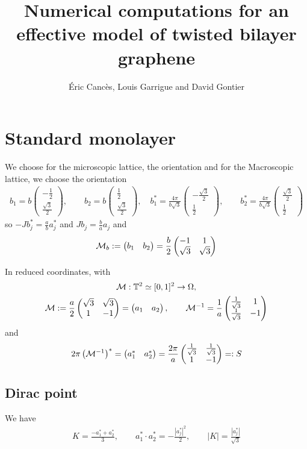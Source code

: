 \documentclass[11pt,a4paper,reqno,french,tikz]{amsart}
\title[Numerics effective TBG]{Numerical computations for an effective model of twisted bilayer graphene}
\author[É. Cancès, L. Garrigue and D. Gontier]{Éric Cancès, Louis Garrigue and David Gontier}
\newcommand{\pa}[1]{\left( #1 \right)} %
\newcommand{\ab}[1]{\left|#1\right|} %
\newcommand{\f}[2]{\frac{#1}{#2}} %
\newcommand{\mat}[1]{\begin{pmatrix} #1 \end{pmatrix}} %
\begin{document}
\maketitle

\section{Standard monolayer}%
\label{sec:standard_monolayer}

We choose for the microscopic lattice, the orientation
{\color{red}{NOT THE RIGHT ONES}}
and for the Macroscopic lattice, we choose the orientation
\begin{multline}\label{def:lattice_b}
b_1 = b \mat{ -\f 12 \\ \f{\sqrt 3}{2}  }, \qquad b_2 = b \mat{ \f 12 \\ \f{\sqrt 3}2}, \quad b^*_1 = \f{4\pi}{b\sqrt{3}} \mat{- \f{\sqrt{3}}{2}\\ \f{1}{2} }, \qquad b^*_2 = \f{4\pi}{b\sqrt{3}} \mat{\f{\sqrt{3}}{2} \\ \f{1}{2} }
\end{multline}
so $-J b_j^* = \f{a}{b} a_j^*$ and $J b_j = \f{b}{a} a_j$ and 
\begin{align*}
	\cM_b := \mat{b_1 & b_2} = \f{b}{2} \mat{-1 & 1 \\ \sqrt 3 & \sqrt 3}
\end{align*}

In reduced coordinates, with 
\begin{multline*}
	\cM : \mathbb{T}^2 \simeq [0,1]^2 \rightarrow \Omega, \\
	\cM :=  \f a2 \mat{\sqrt{3} & \sqrt{3} \\ 1 & -1} = \mat{a_1 & a_2}, \qquad  \cM^{-1} = \f 1a \mat{\f 1{\sqrt 3} & 1 \\ \f 1{\sqrt 3} & -1}
\end{multline*}
and
\begin{align*}
	2\pi \pa{\cM^{-1}}^* = \mat{a_1^* & a_2^*} = \f{2\pi}a \mat{\f{1}{\sqrt 3} & \f{1}{\sqrt 3} \\ 1 & -1} =: S
\end{align*}

\subsection{Dirac point}%
\label{sub:dirac_point}

We have
\begin{align*}
K = \f{-a_1^* +a_2^*}{3}, \qquad a_1^*\cdot a_2^* = -\f{|a_j^*|^2}{2}, \qquad \ab{K} = \f{|a_j^*|}{\sqrt 3}
\end{align*}
\end{document}
